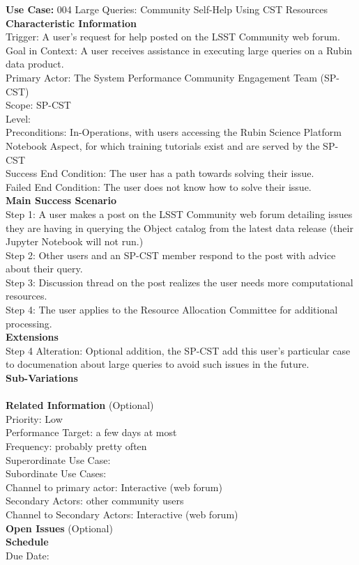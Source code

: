{\bf Use Case:} 004 Large Queries: Community Self-Help Using CST Resources  \\

{\bf Characteristic Information} \\
Trigger: A user's request for help posted on the LSST Community web forum. \\
Goal in Context: A user receives assistance in executing large queries on a Rubin data product. \\
Primary Actor: The System Performance Community Engagement Team (SP-CST) \\
Scope: SP-CST \\
Level: \\
Preconditions: In-Operations, with users accessing the Rubin Science Platform Notebook Aspect, for which training tutorials exist and are served by the SP-CST \\
Success End Condition: The user has a path towards solving their issue. \\
Failed End Condition: The user does not know how to solve their issue. \\

{\bf Main Success Scenario} \\
Step 1: A user makes a post on the LSST Community web forum detailing issues they are having in querying the Object catalog from the latest data release (their Jupyter Notebook will not run.) \\
Step 2: Other users and an SP-CST member respond to the post with advice about their query. \\
Step 3: Discussion thread on the post realizes the user needs more computational resources. \\
Step 4: The user applies to the Resource Allocation Committee for additional processing. \\

{\bf Extensions} \\
Step 4 Alteration: Optional addition, the SP-CST add this user's particular case to documenation about large queries to avoid such issues in the future. \\

{\bf Sub-Variations} \\
\\

{\bf Related Information} (Optional) \\
Priority: Low  \\
Performance Target: a few days at most \\
Frequency: probably pretty often \\
Superordinate Use Case:  \\
Subordinate Use Cases: \\
Channel to primary actor: Interactive (web forum) \\
Secondary Actors: other community users \\
Channel to Secondary Actors: Interactive (web forum) \\

{\bf Open Issues} (Optional) \\

{\bf Schedule} \\
Due Date: \\
